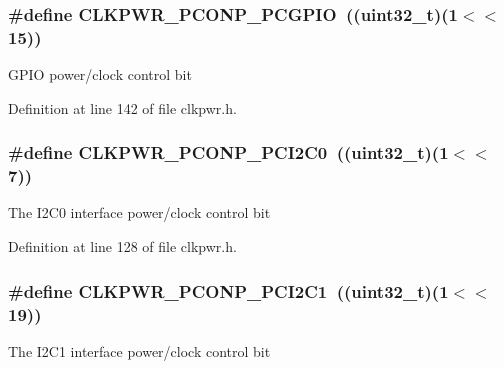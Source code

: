 \subsubsection[{\texorpdfstring{C\+L\+K\+P\+W\+R\+\_\+\+P\+C\+O\+N\+P\+\_\+\+P\+C\+G\+P\+IO}{CLKPWR_PCONP_PCGPIO}}]{\setlength{\rightskip}{0pt plus 5cm}\#define C\+L\+K\+P\+W\+R\+\_\+\+P\+C\+O\+N\+P\+\_\+\+P\+C\+G\+P\+IO~(({\bf uint32\+\_\+t})(1$<$$<$15))}\hypertarget{group___c_l_k_p_w_r___public___macros_ga8f0ed88b2c85cc248595d7071a2df815}{}\label{group___c_l_k_p_w_r___public___macros_ga8f0ed88b2c85cc248595d7071a2df815}
G\+P\+IO power/clock control bit 

Definition at line 142 of file clkpwr.\+h.

\subsubsection[{\texorpdfstring{C\+L\+K\+P\+W\+R\+\_\+\+P\+C\+O\+N\+P\+\_\+\+P\+C\+I2\+C0}{CLKPWR_PCONP_PCI2C0}}]{\setlength{\rightskip}{0pt plus 5cm}\#define C\+L\+K\+P\+W\+R\+\_\+\+P\+C\+O\+N\+P\+\_\+\+P\+C\+I2\+C0~(({\bf uint32\+\_\+t})(1$<$$<$7))}\hypertarget{group___c_l_k_p_w_r___public___macros_gaca155b41f55c089a8480ec160135ffe8}{}\label{group___c_l_k_p_w_r___public___macros_gaca155b41f55c089a8480ec160135ffe8}
The I2\+C0 interface power/clock control bit 

Definition at line 128 of file clkpwr.\+h.

\subsubsection[{\texorpdfstring{C\+L\+K\+P\+W\+R\+\_\+\+P\+C\+O\+N\+P\+\_\+\+P\+C\+I2\+C1}{CLKPWR_PCONP_PCI2C1}}]{\setlength{\rightskip}{0pt plus 5cm}\#define C\+L\+K\+P\+W\+R\+\_\+\+P\+C\+O\+N\+P\+\_\+\+P\+C\+I2\+C1~(({\bf uint32\+\_\+t})(1$<$$<$19))}\hypertarget{group___c_l_k_p_w_r___public___macros_ga533db7f7c151a115b487585d29889199}{}\label{group___c_l_k_p_w_r___public___macros_ga533db7f7c151a115b487585d29889199}
The I2\+C1 interface power/clock control bit 

